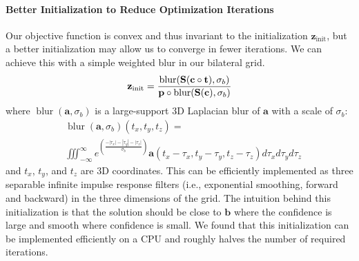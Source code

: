 \paragraph{Better Initialization to Reduce Optimization Iterations}
Our objective function is convex and thus invariant to the initialization $\mathbf{z}_{\mathrm{init}}$, but a better initialization may allow us to converge in fewer iterations. We can achieve this with a simple weighted blur in our bilateral grid.
\begin{equation*}
\mathbf{z}_{\mathrm{init}} = { \operatorname{blur}( \mathbf{S}( \mathbf{c} \circ \mathbf{t}), \sigma_b) \over \mathbf{p} \circ \operatorname{blur}( \mathbf{S}(\mathbf{c}), \sigma_b ) }
\end{equation*}
where $\operatorname{blur}(\mathbf{a}, \sigma_b)$ is a large-support 3D Laplacian blur of $\mathbf{a}$ with a scale of $\sigma_b$:
\begin{equation*}
\begin{split}
  & \operatorname{blur}(\mathbf{a}, \sigma_b)(t_x, t_y, t_z) =  \\
  & \displaystyle \iiint_{-\infty }^{\infty } e^{ \left( \frac{-|\tau_x|-|\tau_y|-|\tau_z|}{\sigma_b} \right)}
      \mathbf{a}(t_x-\tau_x, t_y-\tau_y, t_z-\tau_z ) d \tau_x d \tau_y d \tau_z
\end{split}
\end{equation*}
and $t_x$, $t_y$, and $t_z$ are 3D coordinates.
This can be efficiently implemented as three separable infinite impulse response filters  (i.e., exponential smoothing, forward and backward) in the three dimensions of the grid.
The intuition
behind this initialization is that the solution should be close to $\mathbf{b}$
where the confidence is large and smooth where confidence is small.
We found that this initialization can be implemented efficiently on a CPU and
roughly halves the number of required iterations.

